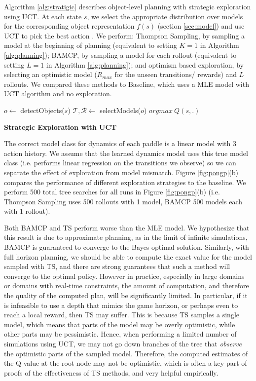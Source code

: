Algorithm \ref{alg:stratigic} describes object-level planning with strategic exploration using UCT. At each state $s$, we select the appropriate distribution over models for the corresponding object representation $f(s)$ (section \ref{sec:model}) and use UCT to pick the best action . We perform: Thompson Sampling, by sampling a model at the beginning of planning (equivalent to setting $K = 1$ in Algorithm \ref{alg:planning}); BAMCP, by sampling a model for each rollout (equivalent to setting $L = 1$ in Algorithm \ref{alg:planning}); and optimism based exploration, by selecting an optimistic model ($R_{max}$ for the unseen transitions/ rewards) and $L$ rollouts. We compared these methods to Baseline, which uses a MLE model with UCT algorithm and no exploration. 

\begin{algorithm}
\SetAlgoLined
$o \gets$ detectObjects($s$)\;
$\mathcal{T}, \mathcal{R} \gets$ selectModels($o$)\;
  \Return $argmax\ Q(s,.)$\;
 \caption{\bf Strategic Exploration with UCT}\label{alg:stratigic}
\end{algorithm}

The correct model class for dynamics of each paddle is a linear model with 3 action history. We assume that the learned dynamics model uses this true model class (i.e. performs linear regression on the transitions we observe) so we can separate the effect of exploration from model mismatch. Figure \ref{fig:pongp}(b) compares the performance of different exploration strategies to the baseline. We perform 500 total tree searches for all runs in Figure \ref{fig:pongp}(b) (i.e. Thompson Sampling uses 500 rollouts with 1 model, BAMCP 500 models each with 1 rollout).

Both BAMCP and TS perform worse than the MLE model. We hypothesize that this result is due to approximate planning, as in the limit of infinite simulations, BAMCP is guaranteed to converge to the Bayes optimal solution. Similarly, with full horizon planning, we should be able to compute the exact value for the model sampled with TS, and there are strong guarantees that such a method will converge to the optimal policy. 
However in practice, especially in large domains or domains with real-time constraints, the amount of computation, and therefore the quality of the computed plan, will be significantly limited. In particular, if it is infeasible to use a depth that mimics the game horizon, or perhaps even to reach a local reward, then TS may suffer. This is because TS samples a single model, which means that parts of the model may be overly optimistic, while other parts may be pessimistic. Hence, when performing a limited number of simulations using UCT, we may not go down branches of the tree that \textit{observe} the optimistic parts of the sampled model. Therefore, the computed estimates of the Q value at the root node may not be optimistic, which is often a key part of proofs of the effectiveness of TS methods, and very helpful empirically. 

